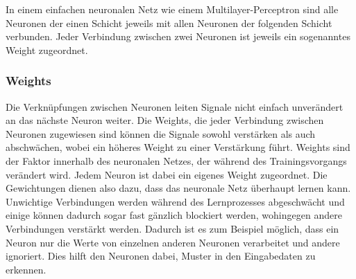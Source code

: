In einem einfachen neuronalen Netz wie einem Multilayer-Perceptron sind alle Neuronen der einen Schicht jeweils mit allen Neuronen der folgenden Schicht verbunden.
Jeder Verbindung zwischen zwei Neuronen ist jeweils ein sogenanntes Weight zugeordnet.


\subsubsection{Weights}\label{subsec:neuronen:verknuepfung_neuronen:Weights}
  Die Verknüpfungen zwischen Neuronen leiten Signale nicht einfach unverändert an das nächste Neuron weiter.
  Die Weights, die jeder Verbindung zwischen Neuronen zugewiesen sind können die Signale sowohl verstärken als auch abschwächen, wobei ein höheres Weight zu einer Verstärkung führt.
  Weights sind der Faktor innerhalb des neuronalen Netzes, der während des Trainingsvorgangs verändert wird.
  Jedem Neuron ist dabei ein eigenes Weight zugeordnet. Die Gewichtungen dienen also dazu, dass das neuronale Netz überhaupt lernen kann.
  Unwichtige Verbindungen werden während des Lernprozesses abgeschwächt und einige können dadurch sogar fast gänzlich blockiert werden, wohingegen andere Verbindungen verstärkt werden.
  Dadurch ist es zum Beispiel möglich, dass ein Neuron nur die Werte von einzelnen anderen Neuronen verarbeitet und andere ignoriert.
  Dies hilft den Neuronen dabei, Muster in den Eingabedaten zu erkennen. 